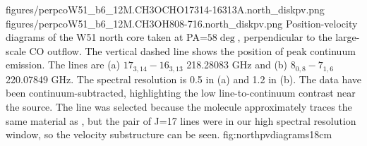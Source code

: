 \documentclass{emulateapj}
\begin{document}
\FigureTwo
{figures/perpcoW51_b6_12M.CH3OCHO17314-16313A.north_diskpv.png}
{figures/perpcoW51_b6_12M.CH3OH808-716.north_diskpv.png}
{Position-velocity diagrams of the W51 north core taken at PA=$58\deg$,
perpendicular to the large-scale CO outflow.  The vertical dashed line shows the
position of peak continuum emission. The lines are (a) \methylformate
$17_{3,14}-16_{3,13}$ 218.28083 GHz and (b) \methanol $8_{0,8}-7_{1,6}$
220.07849 GHz.  The spectral resolution is 0.5 \kms in (a) and 1.2 \kms in (b).
The data have been continuum-subtracted, highlighting the low line-to-continuum
contrast near the source.  The \methylformate line was selected because the
molecule approximately traces the same material as \methanol, but the pair of
\methylformate J=17 lines were in our high spectral resolution window, so the
velocity substructure can be seen.
}
{fig:northpvdiagrams}{1}{8cm}
\end{document}

